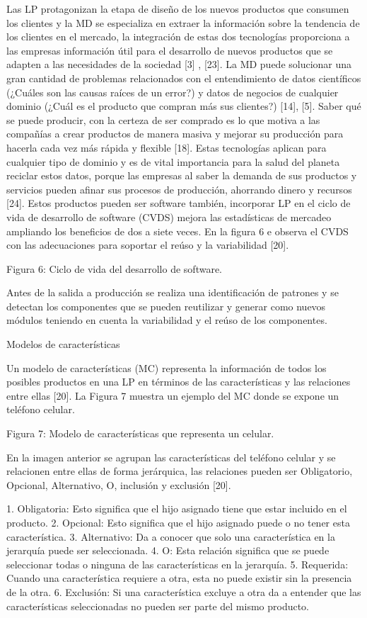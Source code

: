 Las LP protagonizan la etapa de diseño de los nuevos productos que consumen los clientes y la MD se especializa en extraer la información sobre la tendencia de los clientes en el mercado, la integración de estas dos tecnologías proporciona a las empresas información útil para el desarrollo de nuevos productos que se adapten a las necesidades de la sociedad [3] , [23]. La MD puede solucionar una gran cantidad de problemas relacionados con el entendimiento de datos científicos (¿Cuáles son las causas raíces de un error?) y datos de negocios de cualquier dominio (¿Cuál es el producto que compran más sus clientes?) [14], [5]. Saber qué se puede producir, con la certeza de ser comprado es lo que motiva a las compañías a crear productos de manera masiva y mejorar su producción para hacerla cada vez más rápida y flexible [18]. Estas tecnologías aplican para cualquier tipo de dominio y es de vital importancia para la salud del planeta reciclar estos datos, porque las empresas al saber la demanda de sus productos y servicios pueden afinar sus procesos de producción, ahorrando dinero y recursos [24]. Estos productos pueden ser software también, incorporar LP en el ciclo de vida de desarrollo de software (CVDS) mejora las estadísticas de mercadeo ampliando los beneficios de dos a siete veces. En la figura 6 e observa el CVDS con las  adecuaciones para soportar el reúso y la variabilidad [20].


Figura 6: Ciclo de vida del desarrollo de software.

Antes de la salida a producción se realiza una identificación de patrones y se detectan los componentes que se pueden reutilizar y generar como nuevos módulos teniendo en cuenta la variabilidad y el reúso de los componentes.


Modelos de características

Un modelo de características (MC) representa la información de todos los posibles productos en una LP en términos de las características y las relaciones entre ellas [20]. La Figura 7 muestra un ejemplo del MC donde se expone un teléfono celular.


Figura 7: Modelo de características que representa un celular.

En la imagen anterior se agrupan las características del teléfono celular y se relacionen entre ellas de forma jerárquica, las relaciones pueden ser Obligatorio, Opcional, Alternativo, O, inclusión y exclusión [20].

1.	Obligatoria: Esto significa que el hijo asignado tiene que estar incluido en el producto.
2.	Opcional: Esto significa que el hijo asignado puede o no tener esta característica.
3.	Alternativo: Da a conocer que solo una característica en la jerarquía puede ser seleccionada.
4.	O: Esta relación significa que se puede seleccionar todas o ninguna de las características en la jerarquía.
5.	Requerida: Cuando una característica requiere a otra, esta no puede existir sin la presencia de la otra.
6.	Exclusión: Si una característica excluye a otra da a entender que las características seleccionadas no pueden ser parte del mismo producto.

